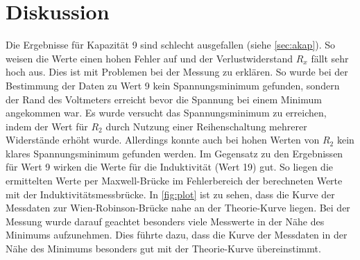 \section{Diskussion}
\label{sec:Diskussion}

Die Ergebnisse für Kapazität 9 sind schlecht ausgefallen (siehe \autoref{sec:akap}). So weisen die Werte einen hohen Fehler auf und der Verlustwiderstand $R_x$ fällt sehr hoch aus. Dies ist mit Problemen bei der Messung zu erklären. So wurde bei der Bestimmung der Daten zu Wert 9 kein Spannungsminimum gefunden, sondern der Rand des Voltmeters erreicht bevor die Spannung bei einem Minimum angekommen war. Es wurde versucht das Spannungsminimum zu erreichen, indem der Wert für $R_2$ durch Nutzung einer Reihenschaltung mehrerer Widerstände erhöht wurde. Allerdings konnte auch bei hohen Werten von $R_2$ kein klares Spannungsminimum gefunden werden.\newline
Im Gegensatz zu den Ergebnissen für Wert 9 wirken die Werte für die Induktivität (Wert 19) gut. So liegen die ermittelten Werte per Maxwell-Brücke im Fehlerbereich der berechneten Werte mit der Induktivitätsmessbrücke.\newline
In \autoref{fig:plot} ist zu sehen, dass die Kurve der Messdaten zur Wien-Robinson-Brücke nahe an der Theorie-Kurve liegen. Bei der Messung wurde darauf geachtet besonders viele Messwerte in der Nähe des Minimums aufzunehmen. Dies führte dazu, dass die Kurve der Messdaten in der Nähe des Minimums besonders gut mit der Theorie-Kurve übereinstimmt. 